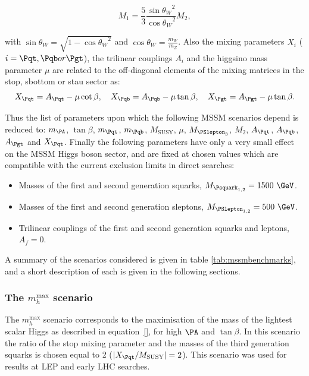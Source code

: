 \begin{equation}
M_{1} = \frac{5}{3}\frac{{\sin{\theta_{W}}}^{2}}{{\cos{\theta_{W}}}^{2}} M_{2},
\label{eq:GUTrelation}
\end{equation}

with $\sin{\theta_{W}} = \sqrt{1-{\cos{\theta_{W}}}^{2}}$ and 
$\cos{\theta_{W} = \frac{m_{W}}{m_{Z}}}$. Also
the mixing parameters $X_{i}$ ($i=\Pqt,\Pqb or
\Pgt$), the trilinear couplings $A_{i}$ and the higgsino mass parameter $\mu$ 
are related to the off-diagonal elements of the mixing matrices in the
stop, sbottom or stau sector as:
\begin{equation}
X_{\Pqt} = A_{\Pqt} -\mu\cot\beta, \quad X_{\Pqb} = A_{\Pqb} -\mu\tan\beta,
\quad X_{\Pgt} = A_{\Pgt} -\mu\tan\beta .
\end{equation}

Thus the list of parameters upon which the following MSSM scenarios depend is
reduced to: $m_{\PA}$, $\tan\beta$, $m_{\Pqt}$, $m_{\Pqb}$, $M_{\text{SUSY}}$,
$\mu$, $M_{\PSlepton_{3}}$, $M_{2}$, $A_{\Pqt}$, $A_{\Pqb}$, $A_{\Pgt}$ and
$X_{\Pqt}$. Finally the following parameters have only a very small effect on
the MSSM Higgs boson sector, and are fixed at chosen values which are compatible
with the current exclusion limits in direct searches:

\begin{itemize}
\item Masses of the first and second generation squarks, $M_{\Psquark_{1,2}} =
1500~\GeV$.
\item Masses of the first and second generation sleptons,  $M_{\PSlepton_{1,2}}
= 500~\GeV$.
\item Trilinear couplings of the first and second generation squarks and
leptons, $A_{f} = 0$.
\end{itemize}

A summary of the scenarios considered is given in table
\ref{tab:mssmbenchmarks}, and a short description of each is given in the
following sections.

\subsubsection{The $m_{h}^{\text{max}}$ scenario}
\label{sec:mhmaxscenario}

The $m_{h}^{\text{max}}$ scenario corresponds to the maximisation of the mass of
the lightest scalar Higgs as described in equation~\ref{}, for high $\PA$ and
$\tan\beta$. In this scenario the ratio of the stop mixing parameter and the
masses of the third generation squarks is chosen equal to 2
($|X_{\Pqt}/M_{\text{SUSY}}| = 2$). This scenario was used for results at LEP
and early LHC searches. 

